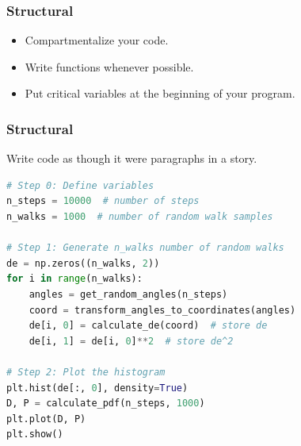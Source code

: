 \begin{frame}[fragile]
  \frametitle{Structural}
  \begin{itemize}
      \item Compartmentalize your code.
      \item Write functions whenever possible.
      \item Put critical variables at the beginning of your program.
  \end{itemize}  
\end{frame}

\begin{frame}[fragile]
  \frametitle{Structural}
    Write code as though it were paragraphs in a story.
    \begin{lstlisting}[language=Python]
# Step 0: Define variables
n_steps = 10000  # number of steps
n_walks = 1000  # number of random walk samples

# Step 1: Generate n_walks number of random walks
de = np.zeros((n_walks, 2))
for i in range(n_walks):
    angles = get_random_angles(n_steps)
    coord = transform_angles_to_coordinates(angles)
    de[i, 0] = calculate_de(coord)  # store de
    de[i, 1] = de[i, 0]**2  # store de^2

# Step 2: Plot the histogram
plt.hist(de[:, 0], density=True)
D, P = calculate_pdf(n_steps, 1000)
plt.plot(D, P)
plt.show()
    \end{lstlisting}
\end{frame}


